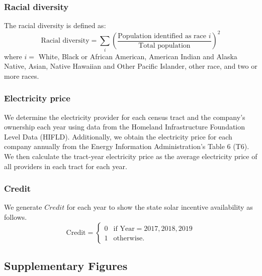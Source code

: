 \documentclass[12pt,twoside,letterpaper]{article}
\begin{document}
\subsubsection*{Racial diversity}
The racial diversity is defined as:
\begin{equation}
\text{Racial diversity} = \sum_{i} (\frac{\text{Population identified as race }i}{\text{Total population}})^2
\end{equation}
where $i = $ White, Black or African American, American Indian and Alaska Native,	Asian, Native Hawaiian and Other Pacific Islander, other race, and two or more races.

\subsubsection*{Electricity price}
We determine the electricity provider for each census tract and the company's ownership each year using data from the Homeland Infrastructure Foundation Level Data (HIFLD). Additionally, we obtain the electricity price for each company annually from the Energy Information Administration's Table 6 (T6). We then calculate the tract-year electricity price as the average electricity price of all providers in each tract for each year.


\subsubsection*{Credit}
We generate $Credit$ for each year to show the state solar incentive availability as follows.  
\[
\text{Credit} = 
\begin{cases} 
 0 & \text{if } \text{Year} = 2017, 2018, 2019 \\
 1 & \text{otherwise.}
\end{cases} 
\]


\subsection{Supplementary Figures}
\end{document}
